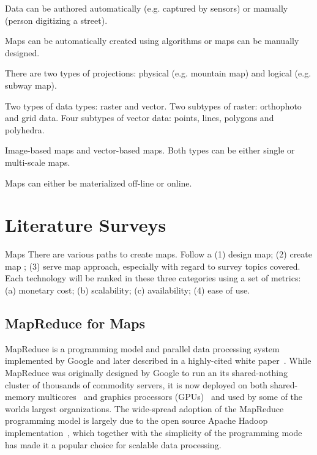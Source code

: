 \documentclass[11pt, oneside]{report}   	%
\begin{document}
Data can be authored automatically (e.g. captured by sensors) or manually (person digitizing a street).

Maps can be automatically created using algorithms or maps can be manually designed.

There are two types of projections: physical (e.g. mountain map) and logical (e.g. subway map).

Two types of data types: raster and vector. Two subtypes of raster: orthophoto and grid data. Four subtypes of vector data: points, lines, polygons and polyhedra.

Image-based maps and vector-based maps. Both types can be either single or multi-scale maps.

Maps can either be materialized off-line or online.

\chapter{Literature Surveys}

Maps There are various paths to create maps.
Follow a (1) design map; (2) create map ; (3) serve map approach, especially with regard to survey topics covered. Each technology will be ranked in these three categories using a set of metrics: (a) monetary cost; (b) scalability; (c) availability; (4) ease of use.


\section{MapReduce for Maps}


MapReduce is a programming model and parallel data processing system implemented by Google and later described in a highly-cited white paper~\cite{dean2008mapreduce}. While MapReduce was originally designed by Google to run an its shared-nothing cluster of thousands of commodity servers, it is now deployed on both shared-memory multicores~\cite{ranger2007multicore} and graphics processors (GPUs)~\cite{he2008mapreducegpu} and used by some of the worlds largest organizations. The wide-spread adoption of the MapReduce programming model is largely due to the open source Apache Hadoop implementation~\cite{apachehadoop}, which together with the simplicity of the programming mode has made it a popular choice for scalable data processing. 
\end{document}
